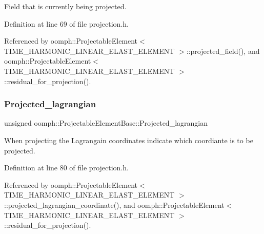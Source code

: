 Field that is currently being projected. 



Definition at line 69 of file projection.\+h.



Referenced by oomph\+::\+Projectable\+Element$<$ T\+I\+M\+E\+\_\+\+H\+A\+R\+M\+O\+N\+I\+C\+\_\+\+L\+I\+N\+E\+A\+R\+\_\+\+E\+L\+A\+S\+T\+\_\+\+E\+L\+E\+M\+E\+N\+T $>$\+::projected\+\_\+field(), and oomph\+::\+Projectable\+Element$<$ T\+I\+M\+E\+\_\+\+H\+A\+R\+M\+O\+N\+I\+C\+\_\+\+L\+I\+N\+E\+A\+R\+\_\+\+E\+L\+A\+S\+T\+\_\+\+E\+L\+E\+M\+E\+N\+T $>$\+::residual\+\_\+for\+\_\+projection().

\mbox{\label{classoomph_1_1ProjectableElementBase_a1034f9a066d1e4116f5b6acf5e5a279c}} 
\subsubsection{\texorpdfstring{Projected\+\_\+lagrangian}{Projected\_lagrangian}}
{\footnotesize\ttfamily unsigned oomph\+::\+Projectable\+Element\+Base\+::\+Projected\+\_\+lagrangian\hspace{0.3cm}{\ttfamily [protected]}}



When projecting the Lagrangain coordinates indicate which coordiante is to be projected. 



Definition at line 80 of file projection.\+h.



Referenced by oomph\+::\+Projectable\+Element$<$ T\+I\+M\+E\+\_\+\+H\+A\+R\+M\+O\+N\+I\+C\+\_\+\+L\+I\+N\+E\+A\+R\+\_\+\+E\+L\+A\+S\+T\+\_\+\+E\+L\+E\+M\+E\+N\+T $>$\+::projected\+\_\+lagrangian\+\_\+coordinate(), and oomph\+::\+Projectable\+Element$<$ T\+I\+M\+E\+\_\+\+H\+A\+R\+M\+O\+N\+I\+C\+\_\+\+L\+I\+N\+E\+A\+R\+\_\+\+E\+L\+A\+S\+T\+\_\+\+E\+L\+E\+M\+E\+N\+T $>$\+::residual\+\_\+for\+\_\+projection().

\mbox{\label{classoomph_1_1ProjectableElementBase_a1081b0f4b3633612639f92d13a187db5}} 
